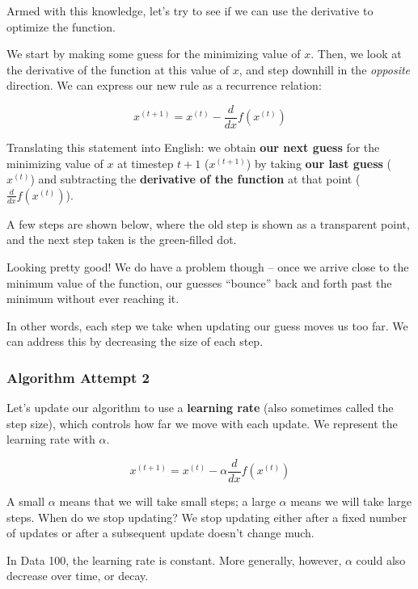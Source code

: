 \documentclass[
  letterpaper,
  DIV=11,
  numbers=noendperiod]{scrreprt}
\begin{document}
Armed with this knowledge, let's try to see if we can use the derivative
to optimize the function.

We start by making some guess for the minimizing value of \(x\). Then,
we look at the derivative of the function at this value of \(x\), and
step downhill in the \emph{opposite} direction. We can express our new
rule as a recurrence relation:

\[x^{(t+1)} = x^{(t)} - \frac{d}{dx} f(x^{(t)})\]

Translating this statement into English: we obtain \textbf{our next
guess} for the minimizing value of \(x\) at timestep \(t+1\)
(\(x^{(t+1)}\)) by taking \textbf{our last guess} (\(x^{(t)}\)) and
subtracting the \textbf{derivative of the function} at that point
(\(\frac{d}{dx} f(x^{(t)})\)).

A few steps are shown below, where the old step is shown as a
transparent point, and the next step taken is the green-filled dot.

Looking pretty good! We do have a problem though -- once we arrive close
to the minimum value of the function, our guesses ``bounce'' back and
forth past the minimum without ever reaching it.

In other words, each step we take when updating our guess moves us too
far. We can address this by decreasing the size of each step.

\subsubsection{Algorithm Attempt 2}\label{algorithm-attempt-2}

Let's update our algorithm to use a \textbf{learning rate} (also
sometimes called the step size), which controls how far we move with
each update. We represent the learning rate with \(\alpha\).

\[x^{(t+1)} = x^{(t)} - \alpha \frac{d}{dx} f(x^{(t)})\]

A small \(\alpha\) means that we will take small steps; a large
\(\alpha\) means we will take large steps. When do we stop updating? We
stop updating either after a fixed number of updates or after a
subsequent update doesn't change much.

\begin{tcolorbox}[enhanced jigsaw, arc=.35mm, left=2mm, toprule=.15mm, leftrule=.75mm, bottomrule=.15mm, colframe=quarto-callout-note-color-frame, rightrule=.15mm, colbacktitle=quarto-callout-note-color!10!white, opacitybacktitle=0.6, coltitle=black, bottomtitle=1mm, colback=white, toptitle=1mm, title=\textcolor{quarto-callout-note-color}{\faInfo}\hspace{0.5em}{Note}, breakable, opacityback=0, titlerule=0mm]

In Data 100, the learning rate is constant. More generally, however,
\(\alpha\) could also decrease over time, or decay.

\end{tcolorbox}
\end{document}
